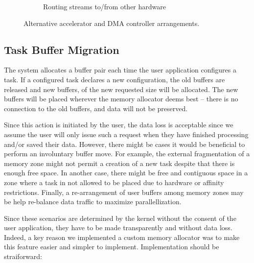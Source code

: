 \begin{figure}[tb!]
\begin{subfigure}[h]{0.6\textwidth}
\caption{Routing streams to/from other hardware}
\end{subfigure}
\caption{Alternative accelerator and DMA controller arrangements.}
\label{fig:alt-arrangements}
\end{figure}

\subsection{Task Buffer Migration}

The system allocates a buffer pair each time the user application configures a task. If a configured task
declares a new configuration, the old buffers are released and new buffers, of the new requested size will be allocated.
The new buffers will be placed wherever the memory allocator deems best -- there is no connection to the old buffers,
and data will not be preserved. 

Since this action is initiated by the user, the data loss is acceptable since we assume the user will only issue such a request
when they have finished processing and/or saved their data. However, there might be cases it would be beneficial to perform
an involuntary buffer move. For example, the external fragmentation of a memory zone might not permit a creation of a new
task despite that there is enough free space. In another case, there might be free and contiguous space in a zone where 
a task in not allowed to be placed due to hardware or affinity restrictions. 
Finally, a re-arrangement of user buffers among memory zones may be help re-balance data traffic to maximize parallellization.

Since these scenarios are determined by the kernel without the consent of the user application, they have to be made transparently
and without data loss. Indeed, a key reason we implemented a custom memory allocator was to make this feature easier and simpler
to implement. Implementation should be straiforward:

